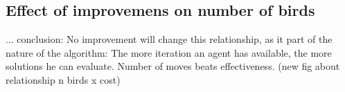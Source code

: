 \subsection{Effect of improvemens on number of birds} \label{Effect of improvemens on number of birds}

... conclusion: No improvement will change this relationship, as it part of the nature of the algorithm: The more iteration an agent has available, the more solutions he can evaluate. Number of moves beats effectiveness. (new fig about relationship n birds x cost)